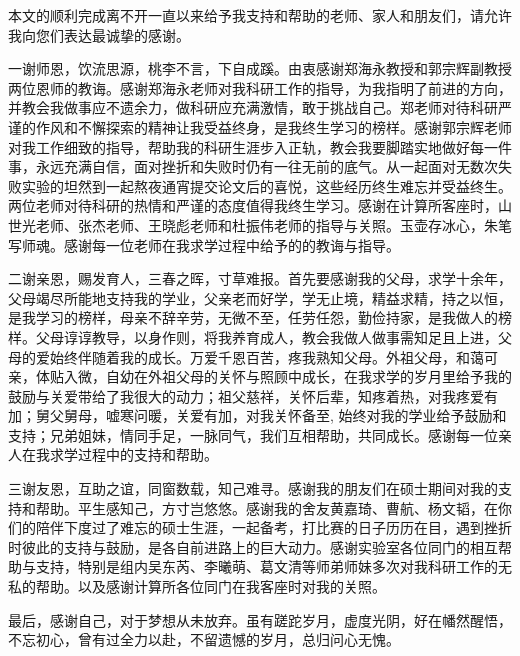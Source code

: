 \begin{acknowledgement}


本文的顺利完成离不开一直以来给予我支持和帮助的老师、家人和朋友们，请允许我向您们表达最诚挚的感谢。

一谢师恩，饮流思源，桃李不言，下自成蹊。由衷感谢郑海永教授和郭宗辉副教授两位恩师的教诲。感谢郑海永老师对我科研工作的指导，为我指明了前进的方向，并教会我做事应不遗余力，做科研应充满激情，敢于挑战自己。郑老师对待科研严谨的作风和不懈探索的精神让我受益终身，是我终生学习的榜样。感谢郭宗辉老师对我工作细致的指导，帮助我的科研生涯步入正轨，教会我要脚踏实地做好每一件事，永远充满自信，面对挫折和失败时仍有一往无前的底气。从一起面对无数次失败实验的坦然到一起熬夜通宵提交论文后的喜悦，这些经历终生难忘并受益终生。两位老师对待科研的热情和严谨的态度值得我终生学习。感谢在计算所客座时，山世光老师、张杰老师、王晓彪老师和杜振伟老师的指导与关照。玉壶存冰心，朱笔写师魂。感谢每一位老师在我求学过程中给予的的教诲与指导。

二谢亲恩，赐发育人，三春之晖，寸草难报。首先要感谢我的父母，求学十余年，父母竭尽所能地支持我的学业，父亲老而好学，学无止境，精益求精，持之以恒，是我学习的榜样，母亲不辞辛劳，无微不至，任劳任怨，勤俭持家，是我做人的榜样。父母谆谆教导，以身作则，将我养育成人，教会我做人做事需知足且上进，父母的爱始终伴随着我的成长。万爱千恩百苦，疼我熟知父母。外祖父母，和蔼可亲，体贴入微，自幼在外祖父母的关怀与照顾中成长，在我求学的岁月里给予我的鼓励与关爱带给了我很大的动力；祖父慈祥，关怀后辈，知疼着热，对我疼爱有加；舅父舅母，嘘寒问暖，关爱有加，对我关怀备至, 始终对我的学业给予鼓励和支持；兄弟姐妹，情同手足，一脉同气，我们互相帮助，共同成长。感谢每一位亲人在我求学过程中的支持和帮助。

三谢友恩，互助之谊，同窗数载，知己难寻。感谢我的朋友们在硕士期间对我的支持和帮助。平生感知己，方寸岂悠悠。感谢我的舍友黄嘉琦、曹航、杨文韬，在你们的陪伴下度过了难忘的硕士生涯，一起备考，打比赛的日子历历在目，遇到挫折时彼此的支持与鼓励，是各自前进路上的巨大动力。感谢实验室各位同门的相互帮助与支持，特别是组内吴东芮、李曦萌、葛文清等师弟师妹多次对我科研工作的无私的帮助。以及感谢计算所各位同门在我客座时对我的关照。

最后，感谢自己，对于梦想从未放弃。虽有蹉跎岁月，虚度光阴，好在幡然醒悟，不忘初心，曾有过全力以赴，不留遗憾的岁月，总归问心无愧。




\end{acknowledgement}



